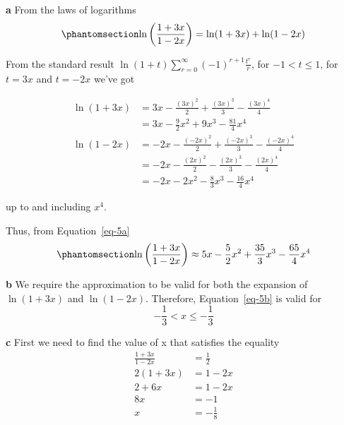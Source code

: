 \documentclass[
  a4paper,
]{report}
\begin{document}
\begin{tcolorbox}[enhanced jigsaw, title={Solution}, titlerule=0mm, colbacktitle=quarto-callout-tip-color!10!white, coltitle=black, toprule=.15mm, colframe=quarto-callout-tip-color-frame, breakable, bottomtitle=1mm, toptitle=1mm, arc=.35mm, rightrule=.15mm, bottomrule=.15mm, left=2mm, opacitybacktitle=0.6, leftrule=.75mm, opacityback=0, colback=white]

\textbf{a} From the laws of logarithms
\begin{equation}\phantomsection\label{eq-5a}{\ln \left( \frac{1+3x}{1-2x}\right) = \ln (1+3x) + \ln (1 -2x)}\end{equation}

From the standard result
\(\ln(1+t) \sum_{r=0}^{\infty}(-1)^{r+1}\frac{t^r}{r}\), for
\(-1 < t \leq 1\), for \(t=3x\) and \(t=-2x\) we've got

\begin{equation*}
\begin{split}
\ln (1+3x) &=3x-\frac{(3x)^2}{2}+\frac{(3x)^3}{3}-\frac{(3x)^4}{4} \\
&= 3x-\frac{9}{2}x^2+9x^3-\frac{81}{4}x^4 \\
\ln (1-2x) &=-2x-\frac{(-2x)^2}{2}+\frac{(-2x)^3}{3}-\frac{(-2x)^4}{4} \\
&=-2x-\frac{(2x)^2}{2}-\frac{(2x)^3}{3}-\frac{(2x)^4}{4} \\
&=-2x-2x^2 -\frac{8}{3}x^3-\frac{16}{4}x^4
\end{split}
\end{equation*}

up to and including \(x^4\).

Thus, from Equation~\ref{eq-5a}
\begin{equation}\phantomsection\label{eq-5b}{\ln \left( \frac{1+3x}{1-2x}\right) \approx 5x-\frac{5}{2}x^2+\frac{35}{3}x^3-\frac{65}{4}x^4}\end{equation}

\textbf{b} We require the approximation to be valid for both the
expansion of \(\ln(1+3x)\) and \(\ln(1-2x)\). Therefore,
Equation~\ref{eq-5b} is valid for \[-\frac{1}{3} < x \leq -\frac{1}{3}\]

\textbf{c} First we need to find the value of x that satisfies the
equality \begin{equation*}
\begin{split}
\frac{1+3x}{1-2x}&=\frac{1}{2} \\
2(1+3x) &=1-2x \\
2+6x&=1-2x\\
8x&=-1\\
x&=-\frac{1}{8}
\end{split}
\end{equation*}


\end{tcolorbox}
\end{document}
